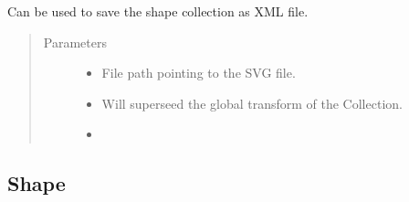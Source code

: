 \documentclass[letterpaper,10pt,english,openany,oneside]{sphinxmanual}
\begin{document}
\begin{fulllineitems}
\begin{fulllineitems}
\label{\detokenize{pages/modules:lmd.lib.Collection.svg_to_lmd}}
\sphinxAtStartPar
Can be used to save the shape collection as XML file.
\begin{quote}\begin{description}
\item[{Parameters}] \leavevmode\begin{itemize}
\item {} 
\sphinxAtStartPar
{} \textendash{} File path pointing to the SVG file.

\item {} 
\sphinxAtStartPar
{} \textendash{} Will superseed the global transform of the Collection.

\item {} 
\sphinxAtStartPar
{} \textendash{} 

\end{itemize}

\end{description}\end{quote}

\end{fulllineitems}


\end{fulllineitems}



\subsection{Shape}
\label{\detokenize{pages/modules:shape}}
\end{document}
